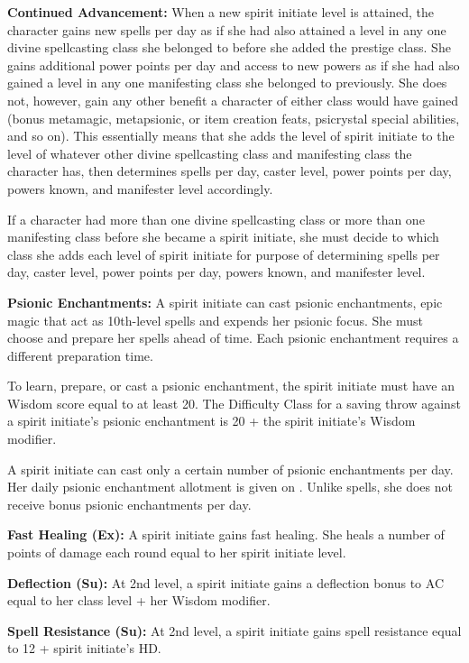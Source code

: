 {
\textbf{Continued Advancement:} When a new spirit initiate level is attained, the character gains new spells per day as if she had also attained a level in any one divine spellcasting class she belonged to before she added the prestige class. She gains additional power points per day and access to new powers as if she had also gained a level in any one manifesting class she belonged to previously. She does not, however, gain any other benefit a character of either class would have gained (bonus metamagic, metapsionic, or item creation feats, psicrystal special abilities, and so on). This essentially means that she adds the level of spirit initiate to the level of whatever other divine spellcasting class and manifesting class the character has, then determines spells per day, caster level, power points per day, powers known, and manifester level accordingly.

If a character had more than one divine spellcasting class or more than one manifesting class before she became a spirit initiate, she must decide to which class she adds each level of spirit initiate for purpose of determining spells per day, caster level, power points per day, powers known, and manifester level.

\textbf{Psionic Enchantments:} A spirit initiate can cast psionic enchantments, epic magic that act as 10th-level spells and expends her psionic focus. She must choose and prepare her spells ahead of time. Each psionic enchantment requires a different preparation time.

To learn, prepare, or cast a psionic enchantment, the spirit initiate must have an Wisdom score equal to at least 20. The Difficulty Class for a saving throw against a spirit initiate's psionic enchantment is 20 + the spirit initiate's Wisdom modifier.

A spirit initiate can cast only a certain number of psionic enchantments per day. Her daily psionic enchantment allotment is given on . Unlike spells, she does not receive bonus psionic enchantments per day.

\textbf{Fast Healing (Ex):} A spirit initiate gains fast healing. She heals a number of points of damage each round equal to her spirit initiate level.

\textbf{Deflection (Su):} At 2nd level, a spirit initiate gains a deflection bonus to AC equal to her class level + her Wisdom modifier.

\textbf{Spell Resistance (Su):} At 2nd level, a spirit initiate gains spell resistance equal to 12 + spirit initiate's HD.

}
